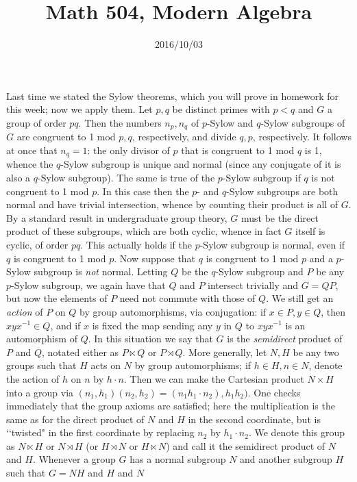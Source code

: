 \documentclass[10pt]{article}
\title{Math 504, Modern Algebra}
\date{2016/10/03}
\begin{document}
\maketitle

Last time we stated the Sylow theorems, which you will prove in homework
for this week; now we apply them. Let $p,q$ be distinct primes with
$p<q$ and $G$ a group of order $pq$. Then the numbers $n_p,n_q$ of
$p$-Sylow and $q$-Sylow subgroups of $G$ are congruent to 1 mod $p,q$,
respectively, and divide $q,p$, respectively. It follows at once that
$n_q = 1$: the only divisor of $p$ that is congruent to 1 mod $q$ is 1,
whence the $q$-Sylow subgroup is unique and normal (since any conjugate
of it is also a $q$-Sylow subgroup). The same is true of the $p$-Sylow
subgroup if $q$ is not congruent to 1 mod $p$. In this case then the
$p$- and $q$-Sylow subgroups are both normal and have trivial
intersection, whence by counting their product is all of $G$. By a
standard result in undergraduate group theory, $G$ must be the direct
product of these subgroups, which are both cyclic, whence in fact $G$
itself is cyclic, of order $pq$. This actually holds if the $p$-Sylow
subgroup is normal, even if $q$ is congruent to 1 mod $p$. Now suppose
that $q$ is congruent to 1 mod $p$ and a $p$-Sylow subgroup is {\sl not}
normal. Letting $Q$ be the $q$-Sylow subgroup and $P$ be any $p$-Sylow
subgroup, we again have that $Q$ and $P$ intersect trivially and $G =
QP$, but now the elements of $P$ need not commute with those of $Q$. We
still get an {\sl action} of $P$ on $Q$ by group automorphisms, via
conjugation: if $x\in P,y\in Q$, then $xyx^{-1}\in Q$, and if $x$ is
fixed the map sending any $y$ in $Q$ to $xyx^{-1}$ is an automorphism of
$Q$. In this situation we say that $G$ is the {\sl semidirect} product
of $P$ and $Q$, notated either as $P\ltimes Q$ or $P\rtimes Q$. More
generally, let $N,H$ be any two groups such that $H$ acts on $N$ by
group automorphisms; if $h\in H,n\in N$, denote the action of $h$ on $n$
by $h\cdot n$. Then we can make the Cartesian product $N\times H$ into a
group via $(n_1,h_1) (n_2,h_2) = (n_1 h_1\cdot n_2),h_1 h_2)$. One
checks immediately that the group axioms are satisfied; here the
multiplication is the same as for the direct product of $N$ and $H$ in
the second coordinate, but is \lq\lq twisted" in the first coordinate by
replacing $n_2$ by $h_1\cdot n_2$. We denote this group as $N\ltimes H$
or $N\rtimes H$ (or $H\rtimes N$ or $H\ltimes N$) and call it the
semidirect product of $N$ and $H$. Whenever a group $G$ has a normal
subgroup $N$ and another subgroup $H$ such that $G = NH$ and $H$ and $N$
\end{document}
